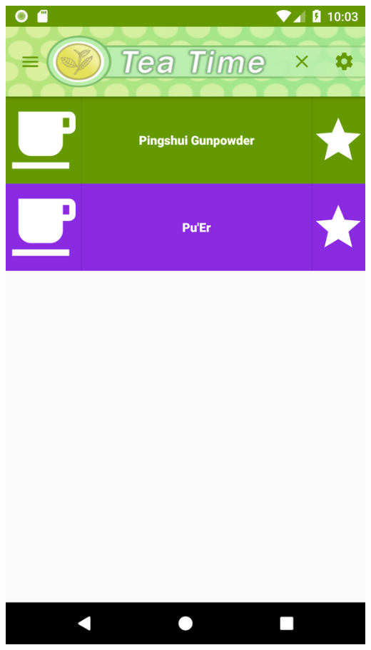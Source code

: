 \documentclass[a4paper,12pt]{article}
\begin{document}
\begin{spacing}{1}
	\includegraphics*[scale=0.1]{Screenshot/08.png}    

\end{spacing}
\end{document}

